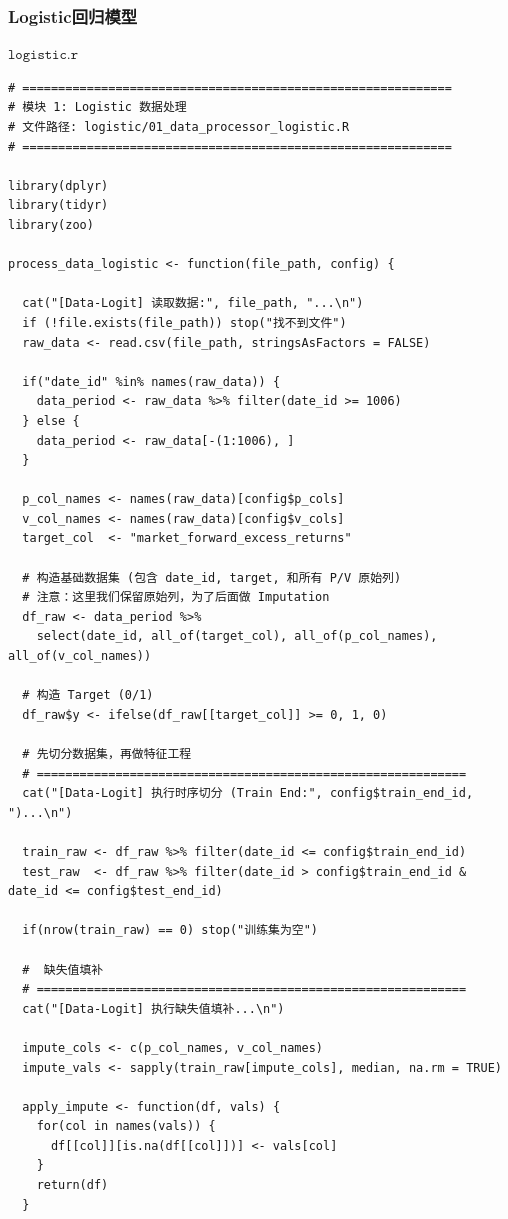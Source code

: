 \documentclass[11pt, a4paper]{article}
\begin{document}
\subsubsection{Logistic回归模型}
$\texttt{logistic.r}$
\begin{verbatim}
# ============================================================
# 模块 1: Logistic 数据处理
# 文件路径: logistic/01_data_processor_logistic.R
# ============================================================

library(dplyr)
library(tidyr)
library(zoo)

process_data_logistic <- function(file_path, config) {
  
  cat("[Data-Logit] 读取数据:", file_path, "...\n")
  if (!file.exists(file_path)) stop("找不到文件")
  raw_data <- read.csv(file_path, stringsAsFactors = FALSE)
  
  if("date_id" %in% names(raw_data)) {
    data_period <- raw_data %>% filter(date_id >= 1006)
  } else {
    data_period <- raw_data[-(1:1006), ]
  }
  
  p_col_names <- names(raw_data)[config$p_cols]
  v_col_names <- names(raw_data)[config$v_cols]
  target_col  <- "market_forward_excess_returns"
  
  # 构造基础数据集 (包含 date_id, target, 和所有 P/V 原始列)
  # 注意：这里我们保留原始列，为了后面做 Imputation
  df_raw <- data_period %>% 
    select(date_id, all_of(target_col), all_of(p_col_names), all_of(v_col_names))
  
  # 构造 Target (0/1)
  df_raw$y <- ifelse(df_raw[[target_col]] >= 0, 1, 0)
  
  # 先切分数据集，再做特征工程
  # ============================================================
  cat("[Data-Logit] 执行时序切分 (Train End:", config$train_end_id, ")...\n")
  
  train_raw <- df_raw %>% filter(date_id <= config$train_end_id)
  test_raw  <- df_raw %>% filter(date_id > config$train_end_id & date_id <= config$test_end_id)
  
  if(nrow(train_raw) == 0) stop("训练集为空")
  
  #  缺失值填补
  # ============================================================
  cat("[Data-Logit] 执行缺失值填补...\n")
  
  impute_cols <- c(p_col_names, v_col_names)
  impute_vals <- sapply(train_raw[impute_cols], median, na.rm = TRUE)
  
  apply_impute <- function(df, vals) {
    for(col in names(vals)) {
      df[[col]][is.na(df[[col]])] <- vals[col]
    }
    return(df)
  }
  

\end{verbatim}
\end{document}
